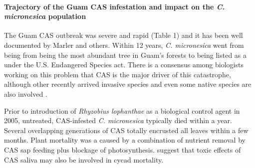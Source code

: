 \documentclass[12pt,letterpaper,english,bibliography=totocnumbered, abstract=on]{scrartcl}
\begin{document}

\paragraph{Trajectory of the Guam CAS infestation and impact on the \textit{C. micronesica} population}

The Guam CAS outbreak was severe and rapid (Table 1) and it has been well documented by Marler and others. Within 12 years, \textit{C. micronesica} went from being from being the most abundant tree in Guam's forests to being listed as a under the U.S. Endangered Species act. There is a consensus among biologists working on this problem that CAS is the major driver of this catastrophe, although other recently arrived invasive species and even some native species are also involved \parencite{mooreCoalitionInvasiveSpecies2013}.

Prior to introduction of \textit{Rhyzobius lophanthae} as a biological control agent in 2005, untreated, CAS-infested \textit{C. micronesica} typically died within a year. Several overlapping generations of CAS totally encrusted all leaves within a few months. Plant mortality was a caused by a combination of nutrient removal by CAS sap feeding plus blockage of photosynthesis. \cite{muniappanCycadAulacaspisScale2012} suggest that toxic effects of CAS saliva may also be involved in cycad mortality.
\end{document}
